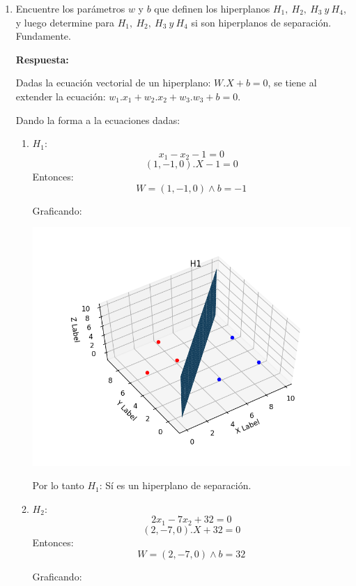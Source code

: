 \documentclass[paper=a4, fontsize=11pt]{scrartcl}
\numberwithin{equation}{section}		%
\numberwithin{figure}{section}			%
\numberwithin{table}{section}				%
\begin{document}
\begin{enumerate}
    \item Encuentre  los parámetros $w$ y $b$ que definen los hiperplanos $H_1,\  H_2,\ H_3\ y\ H_4$, y luego determine para $H_1,\  H_2,\ H_3\ y\ H_4$ si son hiperplanos de separación. Fundamente.
    
    \textbf{Respuesta:}
    
    Dadas la ecuación vectorial de un hiperplano: $W.X + b = 0$, se tiene al extender la ecuación: $w_1.x_1 + w_2.x_2 + w_3.w_3 +b = 0$.
    
    Dando la forma a la ecuaciones dadas:
    
    \begin{enumerate}
        \item $H_1:$
                $$ x_1 - x_2 -1 = 0 $$
                $$ (1,-1,0).X - 1 =0 $$
                Entonces: $$W = (1,-1,0) \wedge b=-1$$
                
                Graficando:
                
                \includegraphics[scale=0.4]{S_H1}
                
                Por lo tanto $H_1$: Sí es un hiperplano de separación.
                
        \item $H_2:$
                $$ 2x_1 - 7x_2 +32 =0 $$
                $$ (2,-7,0).X +32 =0 $$
                Entonces: $$W=(2,-7,0) \wedge b=32$$
                
                Graficando:
                

\end{enumerate}
\end{enumerate}
\end{document}
